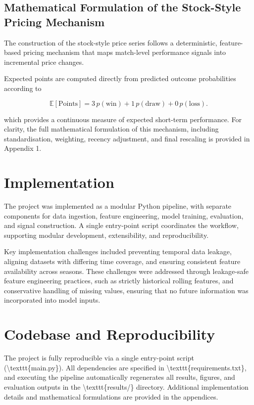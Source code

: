 \documentclass[11pt,a4paper]{article}
\begin{document}
\subsection{Mathematical Formulation of the Stock-Style Pricing Mechanism}

The construction of the stock-style price series follows a deterministic,
feature-based pricing mechanism that maps match-level performance signals
into incremental price changes. 

Expected points are computed directly from predicted outcome probabilities according to

\begin{equation}
\mathbb{E}[\text{Points}] = 3\,p(\text{win}) + 1\,p(\text{draw}) + 0\,p(\text{loss}).
\end{equation}

which provides a continuous measure of expected short-term performance. For clarity, the full mathematical formulation of this mechanism, including standardisation, weighting, recency adjustment, and final rescaling is provided in Appendix 1.

\section{Implementation}
\label{sec:implementation}

The project was implemented as a modular Python pipeline, with separate components for data ingestion, feature engineering, model training, evaluation, and signal construction. A single entry-point script coordinates the workflow, supporting modular development, extensibility, and reproducibility.

Key implementation challenges included preventing temporal data leakage, aligning datasets with differing time coverage, and ensuring consistent feature availability across seasons. These challenges were addressed through leakage-safe feature engineering practices, such as strictly historical rolling features, and conservative handling of missing values, ensuring that no future information was incorporated into model inputs.

\section{Codebase and Reproducibility}
\label{sec:codebase}

The project is fully reproducible via a single entry-point script (\textbackslash{}texttt\{main.py\}). All dependencies are specified in \textbackslash{}texttt\{requirements.txt\}, and executing the pipeline automatically regenerates all results, figures, and evaluation outputs in the \textbackslash{}texttt\{results/\} directory. Additional implementation details and mathematical formulations are provided in the appendices.
\end{document}
